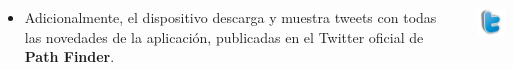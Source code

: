 \begin{frame}
\begin{columns}
    \begin{column}{.8\textwidth}
    \begin{itemize}
    	\item Adicionalmente, el dispositivo descarga y muestra tweets con todas las novedades de la aplicaci\'on, publicadas en el Twitter oficial de \textbf{Path Finder}.
    \end{itemize}
    \end{column}
    \begin{column}{.2\textwidth}\raggedleft
        \includegraphics[width=1.5cm]{imagenes/twitter.png}
    \end{column}
\end{columns}

\end{frame}
